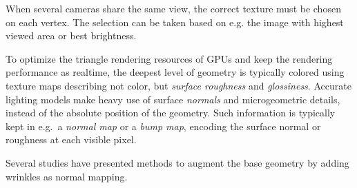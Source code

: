When several cameras share the same view, the correct texture must be chosen on each vertex.
The selection can be taken based on e.g. the image with highest viewed area or best brightness.


To optimize the triangle rendering resources of GPUs and keep the rendering performance as realtime, the deepest level of geometry is typically colored using texture maps describing not color, but \emph{surface roughness} and \emph{glossiness}.
Accurate lighting models make heavy use of surface \emph{normals} and microgeometric details, instead of the absolute position of the geometry.
Such information is typically kept in e.g.\ a \emph{normal map} or a \emph{bump map}, encoding the surface normal or roughness at each visible pixel.

Several studies have presented methods to augment the base geometry by adding wrinkles as normal mapping. \cite{bickel2007multi}




%
%
%
%
%

